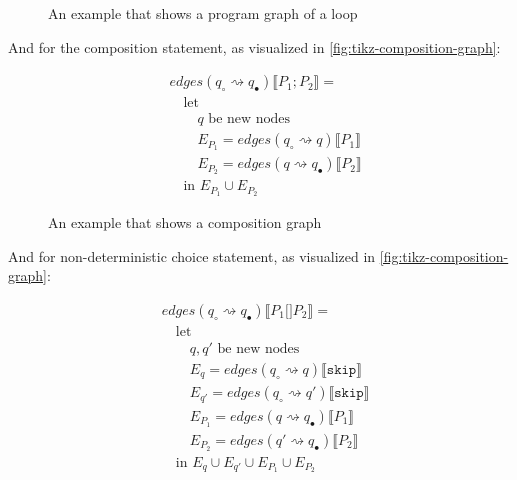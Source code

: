 \begin{figure}[htb!]
    \center
    
    \caption{An example that shows a program graph of a loop}
    \label{fig:tikz-program-graph-loop}
\end{figure}

And for the composition statement, as visualized in \autoref{fig:tikz-composition-graph}:

\begin{equation}
    \begin{split}
        &edges(q_\circ \rightsquigarrow q_\bullet) \lBrack P_1; P_2 \rBrack = \\
        &\quad \text{let } \\
        &\quad\quad q \text{ be new nodes} \\
        &\quad\quad E_{P_1} = edges(q_\circ \rightsquigarrow q) \lBrack P_1 \rBrack \\
        &\quad\quad E_{P_2} = edges(q \rightsquigarrow q_\bullet) \lBrack P_2 \rBrack \\
        &\quad \text{in } E_{P_1} \cup E_{P_2}
    \end{split}\label{eq:equation10}
\end{equation}


\begin{figure}
    \center
    
    \caption{An example that shows a composition graph}
    \label{fig:tikz-composition-graph}
\end{figure}


And for non-deterministic choice statement, as visualized in \autoref{fig:tikz-composition-graph}:

\begin{equation}
    \begin{split}
        &edges(q_\circ \rightsquigarrow q_\bullet) \lBrack P_1 \texttt{[]} P_2 \rBrack = \\
        &\quad \text{let } \\
        &\quad\quad q, q' \text{ be new nodes} \\
        &\quad\quad E_{q} = edges(q_\circ \rightsquigarrow q) \lBrack \texttt{skip} \rBrack \\
        &\quad\quad E_{q'} = edges(q_\circ \rightsquigarrow q') \lBrack \texttt{skip} \rBrack \\
        &\quad\quad E_{P_1}= edges(q \rightsquigarrow q_\bullet) \lBrack P_1 \rBrack \\
        &\quad\quad E_{P_2}= edges(q' \rightsquigarrow q_\bullet) \lBrack P_2 \rBrack \\
        &\quad \text{in } E_{q} \cup E_{q'} \cup E_{P_1} \cup E_{P_2}
    \end{split}\label{eq:equation8}
\end{equation}

